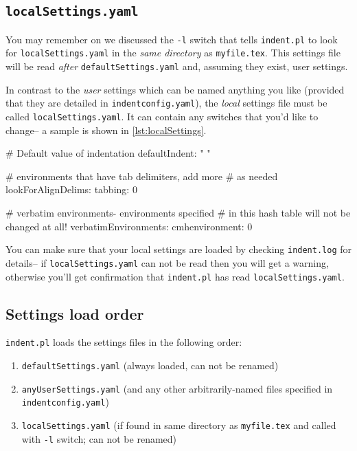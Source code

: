 \subsection{\lstinline!localSettings.yaml!}
You may remember on  we discussed the \lstinline!-l! switch
that tells \lstinline!indent.pl! to look for \lstinline!localSettings.yaml! in the 
\emph{same directory} as \lstinline!myfile.tex!. This settings file will 
be read \emph{after} \lstinline!defaultSettings.yaml! and, assuming they exist, 
user settings. 
 	 	 	 	 	
In contrast to the \emph{user} settings which can be named anything you like (provided that
they are detailed in \lstinline!indentconfig.yaml!), the \emph{local} settings file
must be called \lstinline!localSettings.yaml!. It can contain any switches that you'd
like to change-- a sample is shown in \cref{lst:localSettings}.
 	 	 	 	 	
\begin{yaml}[caption={\lstinline!localSettings.yaml! (example)},label={lst:localSettings}]
# Default value of indentation
defaultIndent: " "

# environments that have tab delimiters, add more 
# as needed
lookForAlignDelims:
   tabbing: 0

#  verbatim environments- environments specified 
#  in this hash table will not be changed at all!
verbatimEnvironments:
    cmhenvironment: 0
\end{yaml}
 	 	 	 	 	
You can make sure that your local settings are loaded by checking \lstinline!indent.log!
for details-- if \lstinline!localSettings.yaml! can not be read then you will
get a warning, otherwise you'll get confirmation that 
\lstinline!indent.pl! has read \lstinline!localSettings.yaml!.
 	 	 	 	 	
\subsection{Settings load order}
\lstinline!indent.pl! loads the settings files in the following order:
\begin{enumerate}
	\item \lstinline!defaultSettings.yaml! (always loaded, can not be renamed)
	\item \lstinline!anyUserSettings.yaml! (and any other arbitrarily-named files specified in \lstinline!indentconfig.yaml!)
	\item \lstinline!localSettings.yaml! (if found in same directory as \lstinline!myfile.tex! and called
	with \lstinline!-l! switch; can not be renamed)
\end{enumerate}

